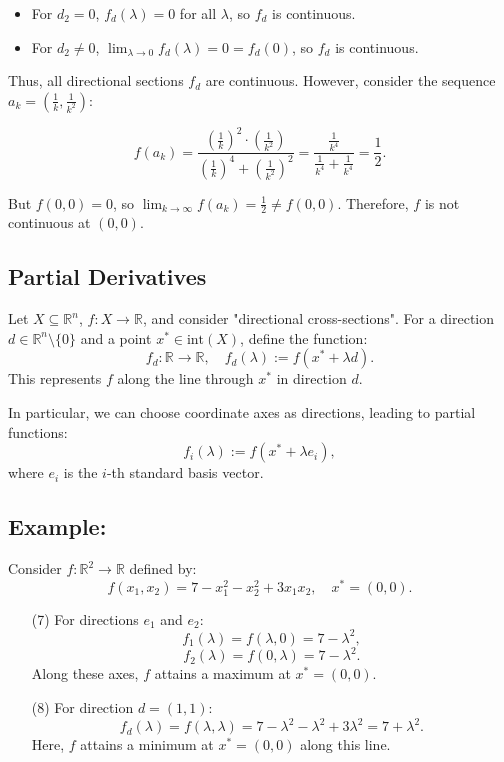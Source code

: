 \documentclass{article}
\begin{document}
\begin{itemize}
    \item For \( d_2 = 0 \), \( f_d(\lambda) = 0 \) for all \( \lambda \), so \( f_d \) is continuous.
    \item For \( d_2 \neq 0 \), \( \lim_{\lambda \to 0} f_d(\lambda) = 0 = f_d(0) \), so \( f_d \) is continuous.
\end{itemize}

Thus, all directional sections \( f_d \) are continuous. However, consider the sequence \( a_k = \left( \frac{1}{k}, \frac{1}{k^2} \right) \):

\[
f(a_k) = \frac{\left( \frac{1}{k} \right)^2 \cdot \left( \frac{1}{k^2} \right)}{\left( \frac{1}{k} \right)^4 + \left( \frac{1}{k^2} \right)^2} = \frac{\frac{1}{k^4}}{\frac{1}{k^4} + \frac{1}{k^4}} = \frac{1}{2}.
\]

But \( f(0, 0) = 0 \), so \( \lim_{k \to \infty} f(a_k) = \frac{1}{2} \neq f(0, 0) \). Therefore, \( f \) is not continuous at \( (0, 0) \).
\newpage
\subsection{Partial Derivatives}
Let \( X \subseteq \mathbb{R}^n \), \( f: X \to \mathbb{R} \), and consider "directional cross-sections". For a direction \( d \in \mathbb{R}^n \setminus \{0\} \) and a point \( x^* \in \text{int}(X) \), define the function:
\[ f_d: \mathbb{R} \to \mathbb{R}, \quad f_d(\lambda) := f(x^* + \lambda d). \]
This represents \( f \) along the line through \( x^* \) in direction \( d \).

In particular, we can choose coordinate axes as directions, leading to partial functions:
\[ f_i(\lambda) := f(x^* + \lambda e_i), \]
where \( e_i \) is the \( i \)-th standard basis vector.

\subsection*{Example:}
Consider \( f: \mathbb{R}^2 \to \mathbb{R} \) defined by:
\[ f(x_1, x_2) = 7 - x_1^2 - x_2^2 + 3x_1x_2, \quad x^* = (0, 0). \]

\begin{itemize}
    \item[(7)] For directions \( e_1 \) and \( e_2 \):
    \[ f_1(\lambda) = f(\lambda, 0) = 7 - \lambda^2, \]
    \[ f_2(\lambda) = f(0, \lambda) = 7 - \lambda^2. \]
    Along these axes, \( f \) attains a maximum at \( x^* = (0, 0) \).

    \item[(8)] For direction \( d = (1, 1) \):
    \[ f_d(\lambda) = f(\lambda, \lambda) = 7 - \lambda^2 - \lambda^2 + 3\lambda^2 = 7 + \lambda^2. \]
    Here, \( f \) attains a minimum at \( x^* = (0, 0) \) along this line.
\end{itemize}
\end{document}
